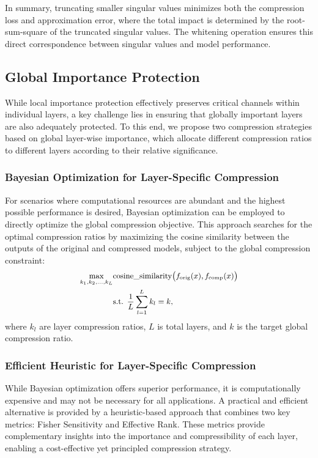 \documentclass[11pt]{article}
\begin{document}
In summary, truncating smaller singular values minimizes both the compression loss and approximation error, where the total impact is determined by the root-sum-square of the truncated singular values. The whitening operation ensures this direct correspondence between singular values and model performance.









\subsection{Global Importance Protection}
While local importance protection effectively preserves critical channels within individual layers, a key challenge lies in ensuring that globally important layers are also adequately protected. To this end, we propose two compression strategies based on global layer-wise importance, which allocate different compression ratios to different layers according to their relative significance.


\subsubsection{Bayesian Optimization for Layer-Specific Compression}

For scenarios where computational resources are abundant and the highest possible performance is desired, Bayesian optimization can be employed to directly optimize the global compression objective. This approach searches for the optimal compression ratios by maximizing the cosine similarity between the outputs of the original and compressed models, subject to the global compression constraint: 
\begin{equation}
\begin{small} 
\begin{aligned}
\max_{k_1, k_2,\ldots,k_L} &\text{cosine\_similarity}\big(f_{\text{orig}}(x), f_{\text{comp}}(x)\big) \\
&\text{s.t. } \frac{1}{L}\sum_{l=1}^L k_l = k,
\end{aligned}
\end{small}
\end{equation}
where $k_l$ are layer compression ratios, $L$ is total layers, and $k$ is the target global compression ratio.

\subsubsection{Efficient Heuristic for Layer-Specific Compression}
While Bayesian optimization offers superior performance, it is computationally expensive and may not be necessary for all applications. A practical and efficient alternative is provided by a heuristic-based approach that combines two key metrics: Fisher Sensitivity and Effective Rank. These metrics provide complementary insights into the importance and compressibility of each layer, enabling a cost-effective yet principled compression strategy.
\end{document}
